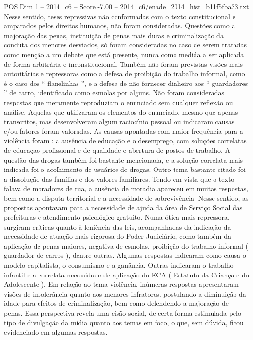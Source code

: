 \begin{textsample}{POS Dim 1 – 2014\_c6 – Score -7.00 – 2014\_c6/enade\_2014\_hist\_b11f5fba33.txt}
Nesse sentido, teses repressivas não conformadas com o texto constitucional e amparados pelos direitos humanos, não foram consideradas.
Questões como a majoração das penas, instituição de penas mais duras e criminalização da conduta dos menores desviados, só foram consideradas no caso de serem tratadas como menção a um debate que está presente, nunca como medida a ser aplicada de forma arbitrária e inconstitucional.
Também não foram previstas visões mais autoritárias e repressoras como a defesa de proibição do trabalho informal, como é o caso dos “ flanelinhas ”, e a defesa de não fornecer dinheiro aos “ guardadores ” de carro, identificado como esmolas por alguns.
Não foram consideradas respostas que meramente reproduziam o enunciado sem qualquer reflexão ou análise.
Aquelas que utilizaram os elementos do enunciado, mesmo que apenas transcritos, mas desenvolveram algum raciocínio pessoal ou indicaram causas e/ou fatores foram valoradas.
As causas apontadas com maior frequência para a violência foram : a ausência de educação e o desemprego, com soluções correlatas de educação profissional e de qualidade e abertura de postos de trabalho.
A questão das drogas também foi bastante mencionada, e a solução correlata mais indicada foi o acolhimento de usuários de drogas.
Outro tema bastante citado foi a dissolução das famílias e dos valores familiares.
Tendo em vista que o texto falava de moradores de rua, a ausência de moradia apareceu em muitas respostas, bem como a disputa territorial e a necessidade de sobrevivência.
Nesse sentido, as propostas apontavam para a necessidade de ajuda da área de Serviço Social das prefeituras e atendimento psicológico gratuito.
Numa ótica mais repressora, surgiram críticas quanto à leniência das leis, acompanhadas da indicação da necessidade de atuação mais rigorosa do Poder Judiciário, como também da aplicação de penas maiores, negativa de esmolas, proibição do trabalho informal ( guardador de carros ), dentre outras.
Algumas respostas indicaram como causa o modelo capitalista, o consumismo e a ganância.
Outras indicaram o trabalho infantil e a correlata necessidade de aplicação do ECA ( Estatuto da Criança e do Adolescente ).
Em relação ao tema violência, inúmeras respostas apresentaram visões de intolerância quanto aos menores infratores, postulando a diminuição da idade para efeitos de criminalização, bem como defendendo a majoração de penas.
Essa perspectiva revela uma cisão social, de certa forma estimulada pelo tipo de divulgação da mídia quanto aos temas em foco, o que, sem dúvida, ficou evidenciado em algumas respostas.

\end{textsample}
